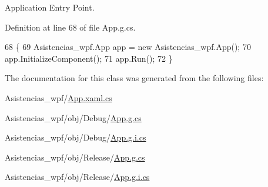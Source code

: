 Application Entry Point. 



Definition at line 68 of file App.\-g.\-cs.


\begin{DoxyCode}
68                                   \{
69             Asistencias\_wpf.App app = \textcolor{keyword}{new} Asistencias\_wpf.App();
70             app.InitializeComponent();
71             app.Run();
72         \}
\end{DoxyCode}


The documentation for this class was generated from the following files\-:\begin{DoxyCompactItemize}
\item 
Asistencias\-\_\-wpf/\hyperlink{_asistencias__wpf_2_app_8xaml_8cs}{App.\-xaml.\-cs}\item 
Asistencias\-\_\-wpf/obj/\-Debug/\hyperlink{_asistencias__wpf_2obj_2_debug_2_app_8g_8cs}{App.\-g.\-cs}\item 
Asistencias\-\_\-wpf/obj/\-Debug/\hyperlink{_asistencias__wpf_2obj_2_debug_2_app_8g_8i_8cs}{App.\-g.\-i.\-cs}\item 
Asistencias\-\_\-wpf/obj/\-Release/\hyperlink{_asistencias__wpf_2obj_2_release_2_app_8g_8cs}{App.\-g.\-cs}\item 
Asistencias\-\_\-wpf/obj/\-Release/\hyperlink{_asistencias__wpf_2obj_2_release_2_app_8g_8i_8cs}{App.\-g.\-i.\-cs}\end{DoxyCompactItemize}
